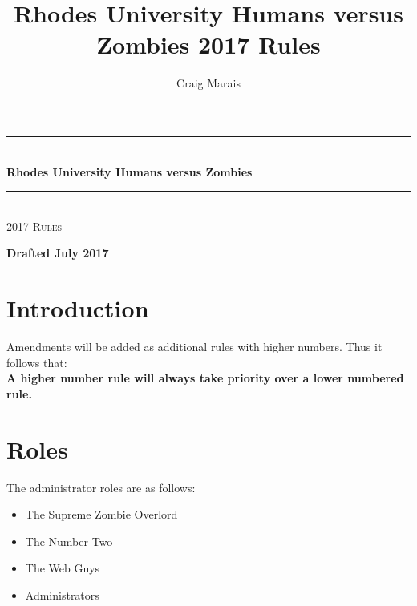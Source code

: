 \documentclass[a4paper,12pt]{article}
\title{Rhodes University Humans versus Zombies 2017 Rules}
\author{Craig Marais}
\begin{document}


\begin{titlepage}
\pagestyle{empty}
\begin{center}




\rule{\linewidth}{0.5mm}
\\[5mm]

{\Large \bfseries Rhodes University Humans versus Zombies}
\rule{\linewidth}{0.5mm}
\\[5mm]

\textsc{\Large 2017 Rules}
\\[5mm]

\vfill

\textbf{Drafted July 2017}

\end{center}
\end{titlepage}

\newpage
\tableofcontents

\newpage
\section{Introduction}
Amendments will be added as additional rules with higher numbers. Thus it follows that:
\\
{\bf A higher number rule will always take priority over a lower numbered rule.}

\section{Roles}

The administrator roles are as follows:
\begin{itemize}
    \item {The Supreme Zombie Overlord}
    \item {The Number Two}
    \item {The Web Guys}
    \item {Administrators}
\end{itemize}
\end{document}
